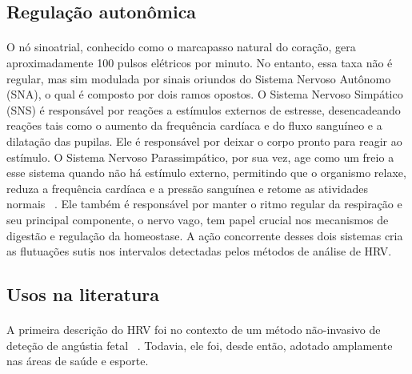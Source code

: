         \subsection {Regulação autonômica}
        
        \paragraph{} O nó sinoatrial, conhecido como o marcapasso natural do coração, gera aproximadamente 100 pulsos elétricos por minuto. No entanto, essa taxa não é regular, mas sim modulada por sinais oriundos do Sistema Nervoso Autônomo (SNA), o qual é composto por dois ramos opostos. O Sistema Nervoso Simpático (SNS) é responsável por reações a estímulos externos de estresse, desencadeando reações tais como o aumento da frequência cardíaca e do fluxo sanguíneo e a dilatação das pupilas. Ele é responsável por deixar o corpo pronto para reagir ao estímulo. O Sistema Nervoso Parassimpático, por sua vez, age como um freio a esse sistema quando não há estímulo externo, permitindo que o organismo relaxe, reduza a frequência cardíaca e a pressão sanguínea e retome as atividades normais ~\cite{Oweis2014QRSSurvey}. Ele também é responsável por manter o ritmo regular da respiração e seu principal componente, o nervo vago, tem papel crucial nos mecanismos de digestão e regulação da homeostase. A ação concorrente desses dois sistemas cria as flutuações sutis nos intervalos detectadas pelos métodos de análise de HRV.
      
        \subsection {Usos na literatura}
        
            \paragraph{} A primeira descrição do HRV foi no contexto de um método não-invasivo de  deteção de angústia fetal ~\cite{Quintana2016GuidelinesCommunication}. Todavia, ele foi, desde então, adotado amplamente nas áreas de saúde e esporte. 
            
